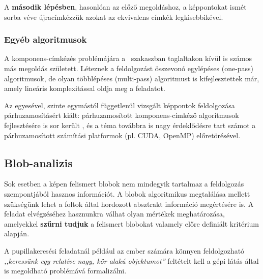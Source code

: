 A \textbf{második lépésben}, hasonlóan az előző megoldáshoz, a képpontokat ismét sorba véve újracímkézzük azokat az ekvivalens címkék legkisebbikével.

\subsubsection{Egyéb algoritmusok}\label{sect:blob_egyeb}

A komponens-címkézés problémájára a ~szakaszban taglaltakon kívül is számos más megoldás született. Léteznek a feldolgozást összevonó egylépéses (one-pass) algoritmusok, de olyan többlépéses (multi-pass) algoritmust is kifejlesztettek már, amely lineáris komplexitással oldja meg a feladatot. \cite{suzuki_lin}

Az egyesével, szinte egymástól függetlenül vizsgált képpontok feldolgozása párhuzamosításért kiált: párhuzamosított komponens-címkéző algoritmusok fejlesztésére is sor került \cite{comp_parallel}, és a téma továbbra is nagy érdeklődésre tart számot a párhuzamosított számítási platformok (pl. CUDA, OpenMP) előretörésével.

\subsection{Blob-analizis}\label{sect:blob_analizis}

Sok esetben a képen felismert blobok nem mindegyik tartalmaz a feldolgozás szempontjából hasznos információt. A blobok algoritmikus megtalálása mellett szükségünk lehet a foltok által hordozott absztrakt információ megértésére is. A feladat elvégzéséhez hasznunkra válhat olyan mértékek meghatározása, amelyekkel \textbf{szűrni tudjuk} a felismert blobokat valamely előre definiált kritérium alapján.

A pupillakeresési feladatnál például az ember számára könnyen feldolgozható \emph{,,keressünk egy relatíve nagy, kör alakú objektumot''} feltételt kell a gépi látás által is megoldható problémává formalizálni.

